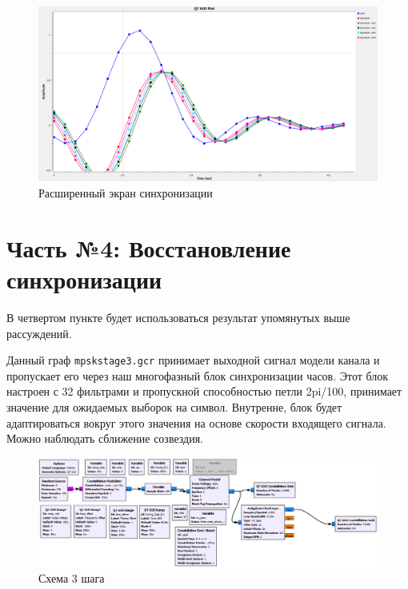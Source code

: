 \documentclass[a4paper]{article}
\begin{document}
            \begin{figure}[H]
                \centering
                \includegraphics[width=\textwidth]{img/p3_8.png}
                \caption{Расширенный экран синхронизации}
                \label{fig:p3_8}
            \end{figure}
            
    \newpage
        \section{Часть №4: Восстановление синхронизации}
            В четвертом пункте будет использоваться результат упомянутых выше рассуждений.
            
            Данный граф \texttt{mpskstage3.gcr} принимает выходной сигнал модели канала и пропускает его через наш многофазный блок синхронизации часов. Этот блок настроен с 32 фильтрами и пропускной способностью петли 2pi/100, принимает значение для ожидаемых выборок на символ. Внутренне, блок будет адаптироваться вокруг этого значения на основе скорости входящего сигнала. Можно наблюдать сближение созвездия.
            
            \begin{figure}[H]
                \centering
                \includegraphics[width=\textwidth]{img/p4_1.png}
                \caption{Схема 3 шага}
                \label{fig:p4_1}
            \end{figure}
            
\end{document}
